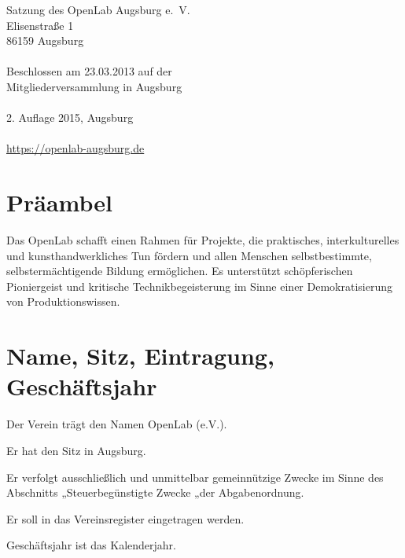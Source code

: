 \documentclass[a5paper, ngerman, 10pt]{scrreprt}
\begin{document}


\thispagestyle{empty}
\vspace*{\fill}
\begin{footnotesize}
    \begin{singlespace}
        \noindent Satzung des OpenLab Augsburg e.~V.\\
        Elisenstraße 1\\
        86159 Augsburg\\
        \\
        Beschlossen am 23.03.2013 auf der\\
        Mitgliederversammlung in Augsburg\\
        \\
        2. Auflage 2015, Augsburg\\
        \\
        \url{https://openlab-augsburg.de}
    \end{singlespace}
\end{footnotesize}
\clearpage

\tableofcontents
\clearpage
    

\section*{Präambel}
Das OpenLab schafft einen Rahmen für Projekte, die praktisches,
interkulturelles und kunsthandwerkliches Tun fördern und allen Menschen
selbstbestimmte, selbstermächtigende Bildung ermöglichen. Es unterstützt
schöpferischen Pioniergeist und kritische Technikbegeisterung im Sinne einer
Demokratisierung von Produktionswissen.


\section{Name, Sitz, Eintragung, Geschäftsjahr}
\begin{compactenum}[(1)]
    \item Der Verein trägt den Namen OpenLab (e.V.).
    \item Er hat den Sitz in Augsburg.
    \item Er verfolgt ausschließlich und unmittelbar gemeinnützige Zwecke im 
        Sinne des Abschnitts „Steuerbegünstigte Zwecke „der Abgabenordnung.
    \item Er soll in das Vereinsregister eingetragen werden.
    \item Geschäftsjahr ist das Kalenderjahr.
\end{compactenum}
\end{document}
